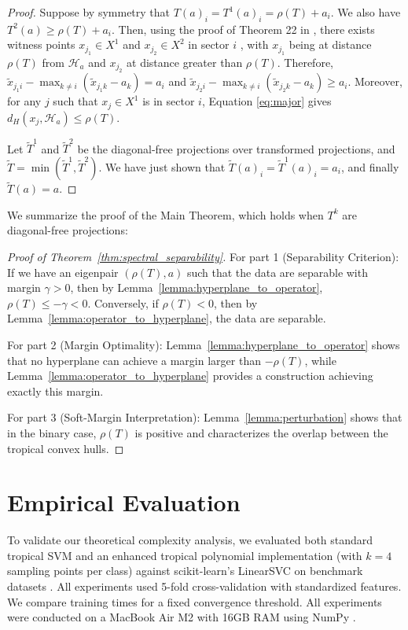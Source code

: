 \documentclass{article}
\begin{document}
\begin{proof}
Suppose by symmetry that $T(a)_{i}=T^{1}(a)_{i}=\rho(T)+a_{i}$. We
also have $T^{2}(a)\ge\rho(T)+a_{i}$. Then, using the proof of Theorem
22 in \cite{akian2020}, there exists witness points $x_{j_{1}}\in X^{1}$ and
$x_{j_{2}}\in X^{2}$ in sector $i$ , with $x_{j_{1}}$ being at
distance $\rho(T)$ from $\mathcal{H}_{a}$ and $x_{j_{2}}$ at distance
greater than $\rho(T)$. Therefore, $\tilde{x}_{j_{1}i}-\max_{k\ne i}(\tilde{x}_{j_{1}k}-a_{k})=a_{i}$
and $\tilde{x}_{j_{2}i}-\max_{k\ne i}(\tilde{x}_{j_{2}k}-a_{k})\ge a_{i}$.
Moreover, for any $j$ such that $x_{j}\in X^1$ is in sector $i$,
Equation \ref{eq:major} gives $d_{H}(x_{j},\mathcal{H}_{a})\le\rho(T)$.

Let $\tilde{T}^{1}$ and $\tilde{T}^{2}$ be the diagonal-free projections
over transformed projections, and $\tilde{T}=\min(\tilde{T}^{1},\tilde{T}^{2})$.
We have just shown that $\tilde{T}(a)_{i}=\tilde{T}^{1}(a)_{i}=a_{i}$,
and finally $\tilde{T}(a)=a$.
\end{proof}

We summarize the proof of the Main Theorem, which holds when $T^k$ are diagonal-free projections:

\begin{proof}[Proof of Theorem~\ref{thm:spectral_separability}]
For part 1 (Separability Criterion): If we have an eigenpair $(\rho(T),a)$ such that the data are separable with margin $\gamma > 0$, then by Lemma~\ref{lemma:hyperplane_to_operator}, $\rho(T) \leq -\gamma < 0$. Conversely, if $\rho(T) < 0$, then by Lemma~\ref{lemma:operator_to_hyperplane}, the data are separable.

For part 2 (Margin Optimality): Lemma~\ref{lemma:hyperplane_to_operator} shows that no hyperplane can achieve a margin larger than $-\rho(T)$, while Lemma~\ref{lemma:operator_to_hyperplane} provides a construction achieving exactly this margin.

For part 3 (Soft-Margin Interpretation): Lemma~\ref{lemma:perturbation} shows that in the binary case, $\rho(T)$ is positive and characterizes the overlap between the tropical convex hulls.
\end{proof}

\section{Empirical Evaluation}\label{appendix:empirical}

To validate our theoretical complexity analysis, we evaluated both standard tropical SVM and an enhanced tropical polynomial implementation (with $k=4$ sampling points per class) against scikit-learn's LinearSVC on benchmark datasets \cite{scikit-learn,waveform_database_generator_(version_1)_107}. All experiments used 5-fold cross-validation with standardized features. We compare training times for a fixed convergence threshold. All experiments were conducted on a MacBook Air M2 with 16GB RAM using NumPy \cite{harris2020array}.
\end{document}
